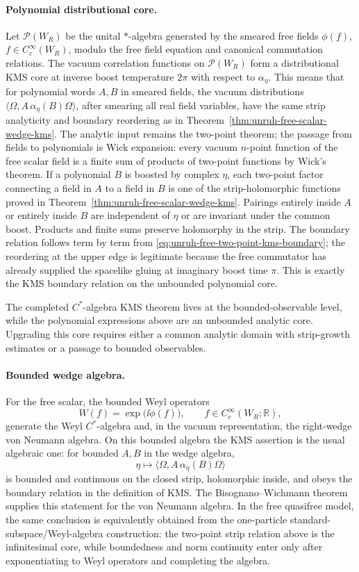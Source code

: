 \paragraph{Polynomial distributional core.}
Let \(\mathcal P(W_R)\) be the unital \(\ast\)-algebra generated by the
smeared free fields \(\phi(f)\), \(f\in C_c^\infty(W_R)\), modulo the free
field equation and canonical commutation relations.  The vacuum correlation
functions on \(\mathcal P(W_R)\) form a distributional KMS core at inverse
boost temperature \(2\pi\) with respect to \(\alpha_\eta\).  This means that
for polynomial words \(A,B\) in smeared fields, the vacuum distributions
\(\langle\Omega,A\,\alpha_\eta(B)\Omega\rangle\), after smearing all real
field variables, have the same strip analyticity and boundary reordering as
in Theorem~\ref{thm:unruh-free-scalar-wedge-kms}.  The analytic input remains
the two-point theorem; the passage from fields to polynomials is Wick
expansion:
every vacuum \(n\)-point function of the free scalar field is a finite sum of
products of two-point functions by Wick's theorem.  If a polynomial \(B\) is
boosted by complex \(\eta\), each two-point factor connecting a field in
\(A\) to a field in \(B\) is one of the strip-holomorphic functions proved in
Theorem~\ref{thm:unruh-free-scalar-wedge-kms}.  Pairings entirely inside
\(A\) or entirely inside \(B\) are independent of \(\eta\) or are invariant
under the common boost.  Products and finite sums preserve holomorphy in the
strip.  The boundary relation follows term by term from
\eqref{eq:unruh-free-two-point-kms-boundary}; the reordering at the upper
edge is legitimate because the free commutator has already supplied the
spacelike gluing at imaginary boost time \(\pi\).  This is exactly the KMS
boundary relation on the unbounded polynomial core.

The completed \(C^\ast\)-algebra KMS theorem lives at the bounded-observable
level, while the polynomial expressions above are an unbounded analytic core.
Upgrading this core requires either a common analytic domain with strip-growth
estimates or a passage to bounded observables.

\paragraph{Bounded wedge algebra.}
For the free scalar, the bounded Weyl operators
\[
  W(f)=\exp\bigl(\ii\phi(f)\bigr),
  \qquad f\in C_c^\infty(W_R;\mathbb R),
\]
generate the Weyl \(C^\ast\)-algebra and, in the vacuum representation, the
right-wedge von Neumann algebra.  On this bounded algebra the KMS assertion is
the usual algebraic one: for bounded \(A,B\) in the wedge algebra,
\[
  \eta\longmapsto\langle\Omega,A\,\alpha_\eta(B)\Omega\rangle
\]
is bounded and continuous on the closed strip, holomorphic inside, and obeys
the boundary relation in the definition of KMS.  The Bisognano--Wichmann
theorem supplies this statement for the von Neumann algebra.  In the free
quasifree model, the same conclusion is equivalently obtained from the
one-particle standard-subspace/Weyl-algebra construction: the two-point
strip relation above is the infinitesimal core, while boundedness and norm
continuity enter only after exponentiating to Weyl operators and completing
the algebra.


